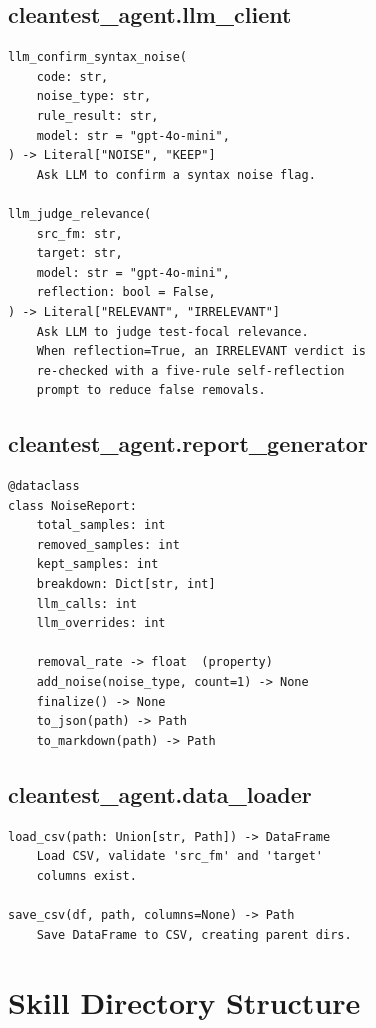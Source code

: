 \documentclass[acmlarge,nonacm,screen]{acmart}
\begin{document}
\subsection{cleantest\_agent.llm\_client}

\begin{lstlisting}[language={},breaklines=true]
llm_confirm_syntax_noise(
    code: str,
    noise_type: str,
    rule_result: str,
    model: str = "gpt-4o-mini",
) -> Literal["NOISE", "KEEP"]
    Ask LLM to confirm a syntax noise flag.

llm_judge_relevance(
    src_fm: str,
    target: str,
    model: str = "gpt-4o-mini",
    reflection: bool = False,
) -> Literal["RELEVANT", "IRRELEVANT"]
    Ask LLM to judge test-focal relevance.
    When reflection=True, an IRRELEVANT verdict is
    re-checked with a five-rule self-reflection
    prompt to reduce false removals.
\end{lstlisting}

\subsection{cleantest\_agent.report\_generator}

\begin{lstlisting}[language={},breaklines=true]
@dataclass
class NoiseReport:
    total_samples: int
    removed_samples: int
    kept_samples: int
    breakdown: Dict[str, int]
    llm_calls: int
    llm_overrides: int
    
    removal_rate -> float  (property)
    add_noise(noise_type, count=1) -> None
    finalize() -> None
    to_json(path) -> Path
    to_markdown(path) -> Path
\end{lstlisting}

\subsection{cleantest\_agent.data\_loader}

\begin{lstlisting}[language={},breaklines=true]
load_csv(path: Union[str, Path]) -> DataFrame
    Load CSV, validate 'src_fm' and 'target'
    columns exist.

save_csv(df, path, columns=None) -> Path
    Save DataFrame to CSV, creating parent dirs.
\end{lstlisting}


\section{Skill Directory Structure}
\label{appendix:skill-structure}
\end{document}
